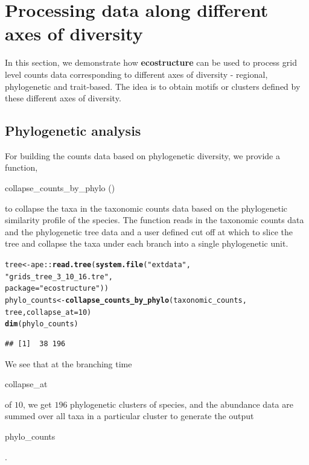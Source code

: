 \documentclass[12pt]{article}\usepackage[]{graphicx}\usepackage[usenames,dvipsnames]{color}
\makeatletter
\newcommand{\hlnum}[1]{\textcolor[rgb]{0.686,0.059,0.569}{#1}}%
\newcommand{\hlstr}[1]{\textcolor[rgb]{0.192,0.494,0.8}{#1}}%
\newcommand{\hlopt}[1]{\textcolor[rgb]{0,0,0}{#1}}%
\newcommand{\hlstd}[1]{\textcolor[rgb]{0.345,0.345,0.345}{#1}}%
\newcommand{\hlkwb}[1]{\textcolor[rgb]{0.69,0.353,0.396}{#1}}%
\newcommand{\hlkwc}[1]{\textcolor[rgb]{0.333,0.667,0.333}{#1}}%
\newcommand{\hlkwd}[1]{\textcolor[rgb]{0.737,0.353,0.396}{\textbf{#1}}}%
\newenvironment{kframe}{%
 \def\at@end@of@kframe{}%
 \ifinner\ifhmode%
  \def\at@end@of@kframe{\end{minipage}}%
  \begin{minipage}{\columnwidth}%
 \fi\fi%
 \def\FrameCommand##1{\hskip\@totalleftmargin \hskip-\fboxsep
 \colorbox{shadecolor}{##1}\hskip-\fboxsep
     \hskip-\linewidth \hskip-\@totalleftmargin \hskip\columnwidth}%
 \MakeFramed {\advance\hsize-\width
   \@totalleftmargin\z@ \linewidth\hsize
   \@setminipage}}%
 {\par\unskip\endMakeFramed%
 \at@end@of@kframe}
\newenvironment{knitrout}{}{} %
\makeatother
\begin{document}
\section{Processing data along different axes of diversity}

In this section, we demonstrate how \textbf{ecostructure} can be used to process
grid level counts data corresponding to different axes of diversity - regional, phylogenetic and trait-based. The idea is to obtain motifs or clusters defined by these different axes of diversity.

\subsection{Phylogenetic analysis}

For building the counts data based on phylogenetic diversity, we provide a function,\\
\begin{verb} collapse_counts_by_phylo () \end{verb} to collapse the taxa in the taxonomic counts data based on the phylogenetic similarity profile of the species.
The function reads in the taxonomic counts data and the phylogenetic tree data and a user defined cut off at which to slice the tree and collapse the taxa under each branch into a single phylogenetic unit.

\begin{knitrout}
\color{fgcolor}\begin{kframe}
\begin{alltt}
\hlstd{tree} \hlkwb{<-} \hlstd{ape}\hlopt{::}\hlkwd{read.tree}\hlstd{(}\hlkwd{system.file}\hlstd{(}\hlstr{"extdata"}\hlstd{,}
                                   \hlstr{"grids_tree_3_10_16.tre"}\hlstd{,}
                                    \hlkwc{package} \hlstd{=} \hlstr{"ecostructure"}\hlstd{))}
\hlstd{phylo_counts} \hlkwb{<-} \hlkwd{collapse_counts_by_phylo}\hlstd{(taxonomic_counts,}
                                         \hlstd{tree,} \hlkwc{collapse_at} \hlstd{=} \hlnum{10}\hlstd{)}
\hlkwd{dim}\hlstd{(phylo_counts)}
\end{alltt}
\begin{verbatim}
## [1]  38 196
\end{verbatim}
\end{kframe}
\end{knitrout}

We see that at the branching time \begin{verb} collapse_at \end{verb} of $10$, we get $196$ phylogenetic clusters of species, and the abundance data are summed over all taxa in a particular cluster to generate the output \begin{verb} phylo_counts \end{verb}.
\end{document}
